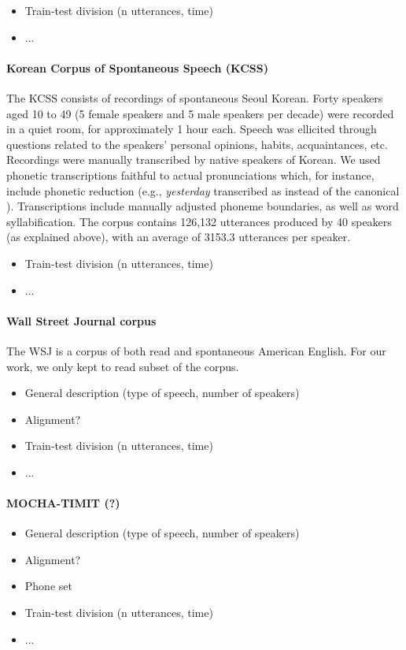 \begin{itemize}
\item Train-test division (n utterances, time)
\item ...
\end{itemize}

\paragraph{Korean Corpus of Spontaneous Speech (KCSS)}

The KCSS \cite{yun2015} consists of recordings of spontaneous Seoul Korean. Forty speakers aged 10 to 49 (5 female speakers and 5 male speakers per decade) were recorded in a quiet room, for approximately 1 hour each. Speech was ellicited through questions related to the speakers' personal opinions, habits, acquaintances, etc.      
Recordings were manually transcribed by native speakers of Korean. We used phonetic transcriptions faithful to actual pronunciations which, for instance, include phonetic reduction (e.g., \textit{yesterday} transcribed as  instead of the canonical ). Transcriptions include {\color{red}manually adjusted} phoneme boundaries, as well as word syllabification.
The corpus contains 126,132 utterances produced by 40 speakers (as explained above), with an average of 3153.3 utterances per speaker. 

\begin{itemize}
\item Train-test division (n utterances, time)
\item ...
\end{itemize}

\paragraph{Wall Street Journal corpus}
The WSJ \cite{} is a corpus of both read and spontaneous American English. For our work, we only kept to read subset of the corpus.  
\begin{itemize}
\item General description (type of speech, number of speakers)
\item Alignment?
\item Train-test division (n utterances, time)
\item ...
\end{itemize}

\paragraph{MOCHA-TIMIT (?)}
\begin{itemize}
\item General description (type of speech, number of speakers)
\item Alignment?
\item Phone set
\item Train-test division (n utterances, time)
\item ...
\end{itemize}

